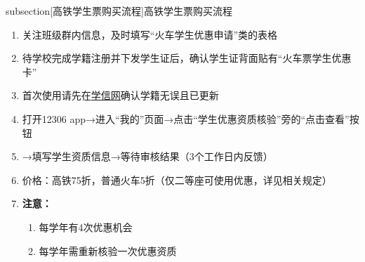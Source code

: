 \newpage %
subsection[高铁学生票购买流程]{高铁学生票\footnotemark 购买流程}
\begin{enumerate}
    \item 关注班级群内信息，及时填写“火车学生优惠申请”类的表格\footnotemark
    \item 待学校完成学籍注册并下发学生证后，确认学生证背面贴有“火车票学生优惠卡”\footnotemark
    \item 首次使用请先在\uline{\href{https://www.chsi.com.cn}{学信网}}确认学籍无误且已更新
    \item 打开12306 app→进入“我的”页面→点击“学生优惠资质核验”旁的“点击查看”按钮
    \item →填写学生资质信息→等待审核结果（3个工作日内反馈）
    \item 价格：高铁75折，普通火车5折（仅二等座可使用优惠，详见相关规定）
    \item \textbf{注意：}
          \begin{enumerate}
              \item 每学年\footnotemark 有4次优惠机会
              \item 每学年需重新核验\footnotemark 一次优惠资质
          \end{enumerate}
\end{enumerate}

